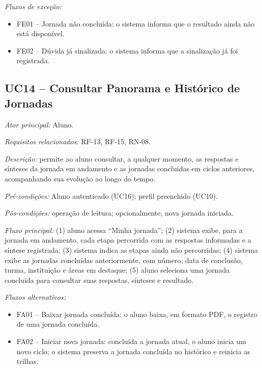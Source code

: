 \textit{Fluxos de exceção:}

\begin{itemize}[label={},leftmargin=\parindent,itemsep=0pt,topsep=0pt]
  \item FE01 – Jornada não concluída: o sistema informa que o resultado ainda não está disponível.
  \item FE02 – Dúvida já sinalizada: o sistema informa que a sinalização já foi registrada.
\end{itemize}

\subsection*{UC14 -- Consultar Panorama e Histórico de Jornadas}\label{uc:uc14}

\textit{Ator principal:} Aluno.

\textit{Requisitos relacionados:} RF-13, RF-15, RN-08.

\textit{Descrição:} permite ao aluno consultar, a qualquer momento, as respostas e sínteses da jornada em andamento e as jornadas concluídas em ciclos anteriores, acompanhando sua evolução ao longo do tempo.

\textit{Pré-condições:} Aluno autenticado (UC16); perfil preenchido (UC10).

\textit{Pós-condições:} operação de leitura; opcionalmente, nova jornada iniciada.

\textit{Fluxo principal:} (1) aluno acessa ``Minha jornada''; (2) sistema exibe, para a jornada em andamento, cada etapa percorrida com as respostas informadas e a síntese registrada; (3) sistema indica as etapas ainda não percorridas; (4) sistema exibe as jornadas concluídas anteriormente, com número, data de conclusão, turma, instituição e áreas em destaque; (5) aluno seleciona uma jornada concluída para consultar suas respostas, sínteses e resultado.

\textit{Fluxos alternativos:}

\begin{itemize}[label={},leftmargin=\parindent,itemsep=0pt,topsep=0pt]
  \item FA01 – Baixar jornada concluída: o aluno baixa, em formato PDF, o registro de uma jornada concluída.
  \item FA02 – Iniciar nova jornada: concluída a jornada atual, o aluno inicia um novo ciclo; o sistema preserva a jornada concluída no histórico e reinicia as trilhas.
\end{itemize}

